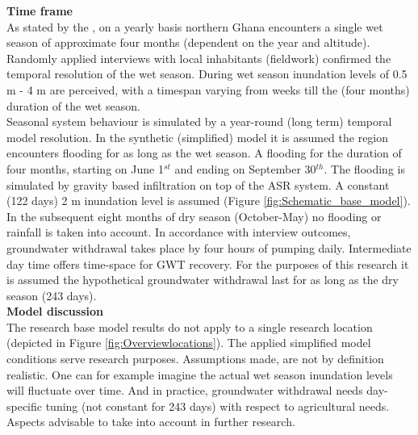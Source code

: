 \textbf{Time frame} \\
As stated by the \citet{HAP2011}, on a yearly basis northern Ghana encounters a single wet season of approximate four months (dependent on the year and altitude). Randomly applied interviews with local inhabitants (fieldwork) confirmed the temporal resolution of the wet season. During wet season inundation levels of 0.5 m - 4 m are perceived, with a timespan varying from weeks till the (four months) duration of the wet season. \\
Seasonal system behaviour is simulated by a year-round (long term) temporal model resolution. In the synthetic (simplified) model it is assumed the region encounters flooding for as long as the wet season. A flooding for the duration of four months, starting on June 1$^{st}$ and ending on September 30$^{th}$. The flooding is simulated by gravity based infiltration on top of the ASR system. A constant (122 days) 2 m inundation level is assumed (Figure \ref{fig:Schematic_base_model}). In the subsequent eight months of dry season (October-May) no flooding or rainfall is taken into account. In accordance with interview outcomes, groundwater withdrawal takes place by four hours of pumping daily. Intermediate day time offers time-space for GWT recovery. For the purposes of this research it is assumed the hypothetical groundwater withdrawal last for as long as the dry season (243 days). \\


\textbf{Model discussion} \\
The research base model results do not apply to a single research location (depicted in Figure \ref{fig:Overviewlocations}). The applied simplified model conditions serve research purposes. Assumptions made, are not by definition realistic. One can for example imagine the actual wet season inundation levels will fluctuate over time. And in practice, groundwater withdrawal needs day-specific tuning (not constant for 243 days) with respect to agricultural needs. Aspects advisable to take into account in further research.\\

